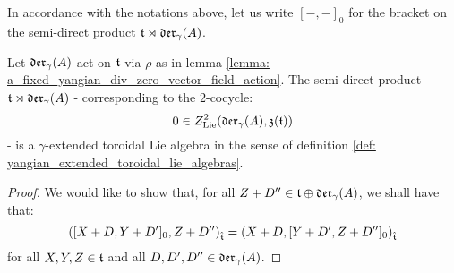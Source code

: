         In accordance with the notations above, let us write $[-, -]_0$ for the bracket on the semi-direct product $\mathfrak{t} \rtimes \mathfrak{der}_{\gamma}(A)$.
        \begin{lemma} \label{lemma: semi_direct_product_of_toroidal_lie_algebras_with_div_zero_vector_fields_are_yangian_extended_toroidal_lie_algebras}
            Let $\mathfrak{der}_{\gamma}(A)$ act on $\mathfrak{t}$ via $\rho$ as in lemma \ref{lemma: a_fixed_yangian_div_zero_vector_field_action}. The semi-direct product $\mathfrak{t} \rtimes \mathfrak{der}_{\gamma}(A)$ - corresponding to the $2$-cocycle:
                $$0 \in Z^2_{\mathrm{Lie}}(\mathfrak{der}_{\gamma}(A), \mathfrak{z}(\mathfrak{t}))$$
            - is a $\gamma$-extended toroidal Lie algebra in the sense of definition \ref{def: yangian_extended_toroidal_lie_algebras}.
        \end{lemma}
            \begin{proof}
                We would like to show that, for all $Z + D'' \in \mathfrak{t} \oplus \mathfrak{der}_{\gamma}(A)$, we shall have that:
                    $$\left( [X + D, Y + D']_0, Z + D'' \right)_{\hat{\mathfrak{t}}} = \left( X + D, [Y + D', Z + D'']_0 \right)_{\hat{\mathfrak{t}}}$$
                for all $X, Y, Z \in \mathfrak{t}$ and all $D, D', D'' \in \mathfrak{der}_{\gamma}(A)$.
                

\end{proof}
